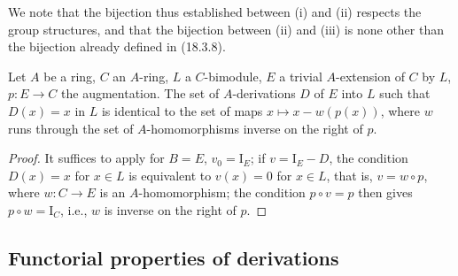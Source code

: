 We note that the bijection thus established between (i) and (ii) respects the group structures, and that the bijection between (ii) and (iii) is none other than the bijection already defined in (18.3.8).

\begin{corollary}[20.1.7]
\label{0.20.1.7}
Let $A$ be a ring, $C$ an $A$-ring, $L$ a $C$-bimodule, $E$ a trivial $A$-extension of $C$ by $L$, $p:E\to C$ the augmentation.
The set of $A$-derivations $D$ of $E$ into $L$ such that $D(x)=x$ in $L$ is identical to the set of maps $x\mapsto x-w(p(x))$, where $w$ runs through the set of $A$-homomorphisms inverse on the right of $p$.
\end{corollary}

\begin{proof}
It suffices to apply  for $B=E$, $v_0=\mathrm{I}_E$; if $v=\mathrm{I}_E-D$, the condition $D(x)=x$ for $x\in L$ is equivalent to $v(x)=0$ for $x\in L$, that is, $v=w\circ p$, where $w:C\to E$ is an $A$-homomorphism; the condition $p\circ v=p$ then gives $p\circ w=\mathrm{I}_C$, i.e., $w$ is inverse on the right of $p$.
\end{proof}

\subsection{Functorial properties of derivations}
\label{subsection:0.20.2}

